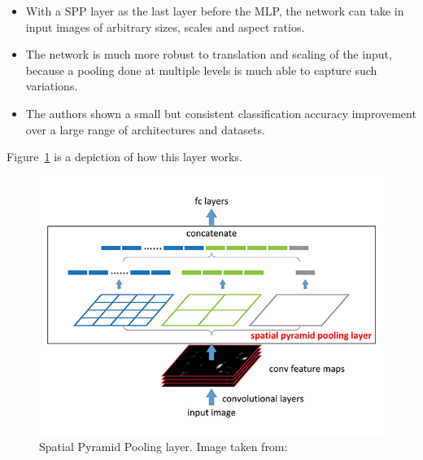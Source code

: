 \documentclass[../main.tex]{subfiles}
\begin{document}
    \begin{itemize}
        \item With a SPP layer as the last layer before the MLP, the network can take in input images of arbitrary sizes, scales and aspect ratios.
        \item The network is much more robust to translation and scaling of the input, because a pooling done at multiple levels is much able to capture
            such variations.
        \item The authors shown a small but consistent classification accuracy improvement over a large range of architectures and datasets.
    \end{itemize}

    Figure~\ref{fig:sppnet} is a depiction of how this layer works. 
    \begin{figure}[h!]
        \includegraphics[width=\linewidth]{./img/sppnet.png}
        \caption{Spatial Pyramid Pooling layer. Image taken from:~\cite{sppooling}}\label{fig:sppnet}
    \end{figure}
    
\end{document}
